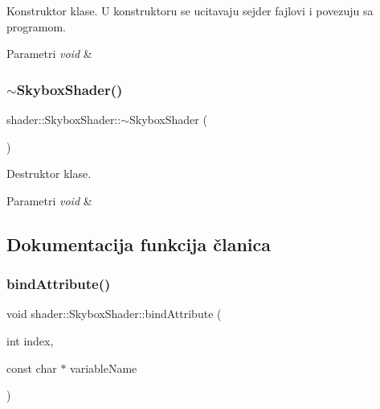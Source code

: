 Konstruktor klase. U konstruktoru se ucitavaju sejder fajlovi i povezuju sa programom. 


\begin{DoxyParams}{Parametri}
{\em void} & \\
\hline
\end{DoxyParams}
\mbox{\label{classshader_1_1SkyboxShader_a95a5bab5ba781c47c594621f4f0059f4}} 
\subsubsection{\texorpdfstring{$\sim$\+Skybox\+Shader()}{~SkyboxShader()}}
{\footnotesize\ttfamily shader\+::\+Skybox\+Shader\+::$\sim$\+Skybox\+Shader (\begin{DoxyParamCaption}{ }\end{DoxyParamCaption})}



Destruktor klase. 


\begin{DoxyParams}{Parametri}
{\em void} & \\
\hline
\end{DoxyParams}


\subsection{Dokumentacija funkcija članica}
\mbox{\label{classshader_1_1SkyboxShader_ab97f006a672c72d1821f16e20f50307e}} 
\subsubsection{\texorpdfstring{bind\+Attribute()}{bindAttribute()}}
{\footnotesize\ttfamily void shader\+::\+Skybox\+Shader\+::bind\+Attribute (\begin{DoxyParamCaption}\item[{int}]{index,  }\item[{const char $\ast$}]{variable\+Name }\end{DoxyParamCaption})}



